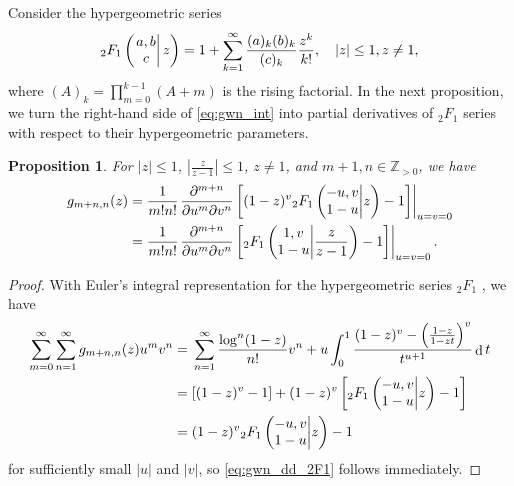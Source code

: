 \documentclass[final,notitlepage,12pt,reqno]{amsart}
\DeclareMathOperator{\D}{d}
\theoremstyle{plain}
\newtheorem{proposition}[theorem]{Proposition}
\theoremstyle{definition}
\numberwithin{equation}{section}
\begin{document}
Consider the hypergeometric  series\begin{align}
_2F_1\left( \left.\begin{array}{@{}c@{}}
a,b \\
c \\
\end{array}\right|z \right)=1+\sum_{k=1}^\infty\frac{(a)_k(b)_k}{(c)_k}\frac{z^k}{k!},\quad|z|\leq 1,z\neq1, \label{eq:2F1_defn}
\end{align}
where $ (A)_{k}=\prod_{m=0}^{k-1}(A+m)$ is the rising factorial. In the next proposition, we turn the right-hand side of    \eqref{eq:gwn_int} into partial derivatives of  $ _2F_1$   series with respect to their  hypergeometric parameters.\begin{proposition}
For $ |z|\leq1$, $ \left\vert \frac{z}{z-1} \right\vert\leq1$, $ z\neq1$, and $ m+1,n\in\mathbb Z_{>0}$, we have\begin{subequations}\begin{align}
g_{m+n,n}(z)={}&\frac1{m!n!}\left.\!\frac{\partial^{m+n}}{\partial u^{m}\partial v^n}\left[ (1-z)^{v}{_2}F_1\left(\begin{array}{@{}c@{}}
-u,v \\
1-u \\
\end{array}\middle| z\right) -1\right]\right|_{u=v=0}\label{eq:gwn_dd_2F1}\\={}&\frac1{m!n!}\left.\!\frac{\partial^{m+n}}{\partial u^{m}\partial v^n}\left[ {_2}F_1\left(\begin{array}{@{}c@{}}
1,v \\
1-u \\
\end{array}\middle| \frac{z}{z-1}\right) -1\right]\right|_{u=v=0}.\label{eq:gwn_dd_2F1Pfaff}
\end{align}\end{subequations}\end{proposition}\begin{proof}With Euler's integral representation for the hypergeometric series  $ _2F_1$ \cite[Theorem 2.2.1]{AAR}, we have\begin{align}
\begin{split}\sum _{m=0}^\infty \sum _{n=1}^\infty g_{m+n,n}(z)u^mv^n={}&\sum _{n=1}^\infty \frac{\log^n(1-z)}{n!}v^n+u\int_0^1 \frac{(1-z)^{v}-\left(\frac{1-z}{1-zt}\right)^v}{t^{u+1}}\D t\\={}&[(1-z)^{v}-1]+(1-z)^{v}\left[{_2}F_1\left(\begin{array}{@{}c@{}}
-u,v \\
1-u \\
\end{array}\middle| z\right) -1 \right]\\={}&(1-z)^{v}{_2}F_1\left(\begin{array}{@{}c@{}}
-u,v \\
1-u \\
\end{array}\middle| z\right)-1
\end{split}
\end{align}for sufficiently small $|u| $ and $|v|$, so  \eqref{eq:gwn_dd_2F1} follows immediately.


\end{proof}
\end{document}
